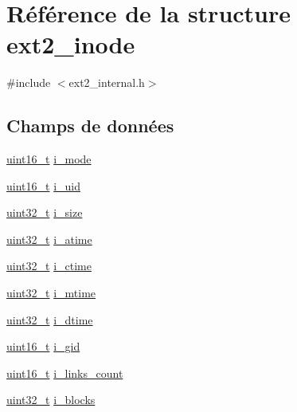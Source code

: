 \hypertarget{structext2__inode}{\section{\-Référence de la structure ext2\-\_\-inode}
\label{structext2__inode}
}


{\ttfamily \#include $<$ext2\-\_\-internal.\-h$>$}

\subsection*{\-Champs de données}
\begin{DoxyCompactItemize}
\item 
\hyperlink{types_8h_adf4d876453337156dde61095e1f20223}{uint16\-\_\-t} \hyperlink{structext2__inode_ab18d6b6ddb4d36a2faff527b43241126}{i\-\_\-mode}
\item 
\hyperlink{types_8h_adf4d876453337156dde61095e1f20223}{uint16\-\_\-t} \hyperlink{structext2__inode_a082def4b3c1c0c5f9dce1eab8ba51189}{i\-\_\-uid}
\item 
\hyperlink{types_8h_a33594304e786b158f3fb30289278f5af}{uint32\-\_\-t} \hyperlink{structext2__inode_a2b9e2a1c732aa02b5dead0948fb47c72}{i\-\_\-size}
\item 
\hyperlink{types_8h_a33594304e786b158f3fb30289278f5af}{uint32\-\_\-t} \hyperlink{structext2__inode_adb682923fb8b418217d78fd78737406b}{i\-\_\-atime}
\item 
\hyperlink{types_8h_a33594304e786b158f3fb30289278f5af}{uint32\-\_\-t} \hyperlink{structext2__inode_a7d45cc039be5128d9771412191e55544}{i\-\_\-ctime}
\item 
\hyperlink{types_8h_a33594304e786b158f3fb30289278f5af}{uint32\-\_\-t} \hyperlink{structext2__inode_a7eb44698eabf570fee0e65d22cc5fbd1}{i\-\_\-mtime}
\item 
\hyperlink{types_8h_a33594304e786b158f3fb30289278f5af}{uint32\-\_\-t} \hyperlink{structext2__inode_a2a30cea7fb676d2fa5e9f0bd799dfa7c}{i\-\_\-dtime}
\item 
\hyperlink{types_8h_adf4d876453337156dde61095e1f20223}{uint16\-\_\-t} \hyperlink{structext2__inode_af1686b705ca7912d370d12ceaab83b8b}{i\-\_\-gid}
\item 
\hyperlink{types_8h_adf4d876453337156dde61095e1f20223}{uint16\-\_\-t} \hyperlink{structext2__inode_aa6d7753ffe6e8634bafe0b55638ee29a}{i\-\_\-links\-\_\-count}
\item 
\hyperlink{types_8h_a33594304e786b158f3fb30289278f5af}{uint32\-\_\-t} \hyperlink{structext2__inode_a6e5b258ebc92b6ae75c61572c60cbb4b}{i\-\_\-blocks}

\end{DoxyCompactItemize}
